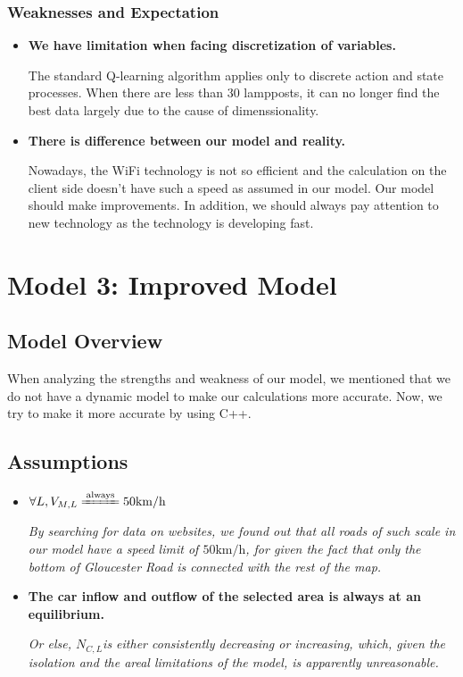 \documentclass[12pt]{article}
\theoremstyle{definition}
\theoremstyle{remark}
\numberwithin{equation}{section}
\begin{document}
	\subsubsection*{Weaknesses and Expectation}
	\begin{itemize}
		\item \textbf{We have limitation when facing discretization of variables.}
		
		The standard Q-learning algorithm applies only to discrete action and state processes. When there are less than 30 lampposts, it can no longer find the best data largely due to the cause of dimenssionality.\cite{drawback}
				
		\item \textbf{There is difference between our model and reality.}
		
		Nowadays, the WiFi technology is not so efficient and the calculation on the client side doesn't have such a speed as assumed in our model. Our model should make improvements. In addition, we should always pay attention to new technology as the technology is developing fast.
	\end{itemize}
	\section{Model 3: Improved Model}
	\subsection{Model Overview}
		When analyzing the strengths and weakness of our model, we mentioned that we do not have a dynamic model to make our calculations more accurate. Now, we try to make it more accurate by using C++.
	\subsection{Assumptions}
	\begin{itemize}
		\item \textbf{$\forall L, V_{M,L}\xlongequal{\mathrm{always}}50\mathrm{km}/\mathrm{h}$}
		
		\textit{By searching for data on websites\cite{Traffic}, we found out that all roads of such scale in our model have a speed limit of $50\mathrm{km}/\mathrm{h}$, for given the fact that only the bottom of Gloucester Road is connected with the rest of the map.}
		\item \textbf{The car inflow and outflow of the selected area is always at an equilibrium.}
		
		\textit{Or else, $N_{C,L}$​​​​​​ is either consistently decreasing or increasing, which, given the isolation and the areal limitations of the model, is apparently unreasonable.}
	\end{itemize}
\end{document}
